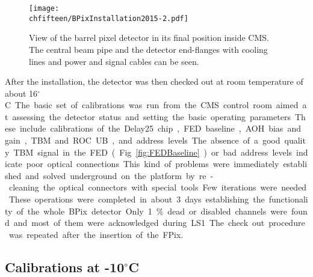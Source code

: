 \begin{figure}[!htb]
 \begin{center}
 \texttt{[image: \\chfifteen/BPixInstallation2015-2.pdf]}
 \end{center}
 \caption{View of the barrel pixel detector in its final position inside CMS. The central beam pipe and the detector end-flanges with cooling lines and power and signal cables can be seen.}
 \label{fig:BPixInst3}
\end{figure}

After the installation, the detector was then checked out at room temperature of about 16\unit{$^\circ$C}.
The basic set of calibrations was run from the CMS control room aimed at assessing the detector status and setting the basic operating parameters.
These include calibrations of the Delay25 chip, FED baseline, AOH bias and gain, TBM and ROC UB, and address levels.
The absence of a good quality TBM signal in the FED (Fig.~\ref{fig:FEDBaseline}) or bad address levels indicate poor optical connections.
This kind of problems were immediately established and solved underground on the platform by re-cleaning the optical connectors with special tools.
Few iterations were needed.
These operations were completed in about 3 days establishing the functionality of the whole BPix detector.
Only 1\% dead or disabled channels were found and most of them were acknowledged during LS1.
The check out procedure was repeated after the insertion of the FPix.

\subsection{Calibrations at -10\unit{$^\circ$C}}\label{sec:FinalBPixCalib}

